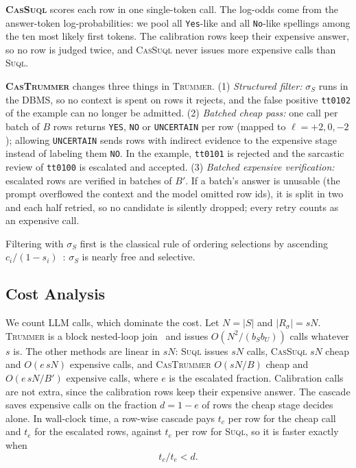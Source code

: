\documentclass[sigconf]{acmart}
\begin{document}
\textbf{\textsc{CasSuql}} scores each row in one single-token call. The log-odds come from the answer-token log-probabilities: we pool all \texttt{Yes}-like and all \texttt{No}-like spellings among the ten most likely first tokens. The calibration rows keep their expensive answer, so no row is judged twice, and \textsc{CasSuql} never issues more expensive calls than \textsc{Suql}.

\textbf{\textsc{CasTrummer}} changes three things in \textsc{Trummer}. (1) \emph{Structured filter:} $\sigma_S$ runs in the DBMS, so no context is spent on rows it rejects, and the false positive \texttt{tt0102} of the example can no longer be admitted. (2) \emph{Batched cheap pass:} one call per batch of $B$ rows returns \texttt{YES}, \texttt{NO} or \texttt{UNCERTAIN} per row (mapped to $\ell=+2,0,-2$); allowing \texttt{UNCERTAIN} sends rows with indirect evidence to the expensive stage instead of labeling them \texttt{NO}. In the example, \texttt{tt0101} is rejected and the sarcastic review of \texttt{tt0100} is escalated and accepted. (3) \emph{Batched expensive verification:} escalated rows are verified in batches of $B'$. If a batch's answer is unusable (the prompt overflowed the context and the model omitted row ids), it is split in two and each half retried, so no candidate is silently dropped; every retry counts as an expensive call.

Filtering with $\sigma_S$ first is the classical rule of ordering selections by ascending $c_i/(1-s_i)$~\cite{hellerstein1993predicate,urban2024eleet}: $\sigma_S$ is nearly free and selective.

\subsection{Cost Analysis}
\label{sec:cost}
We count LLM calls, which dominate the cost. Let $N=|S|$ and $|R_\sigma|=sN$. \textsc{Trummer} is a block nested-loop join~\cite{garcia2008database,ramakrishnan2003database} and issues $O(N^2/(b_Sb_U))$ calls whatever $s$ is. The other methods are linear in $sN$: \textsc{Suql} issues $sN$ calls, \textsc{CasSuql} $sN$ cheap and $O(e\,sN)$ expensive calls, and \textsc{CasTrummer} $O(sN/B)$ cheap and $O(e\,sN/B')$ expensive calls, where $e$ is the escalated fraction. Calibration calls are not extra, since the calibration rows keep their expensive answer. The cascade saves expensive calls on the fraction $d=1-e$ of rows the cheap stage decides alone. In wall-clock time, a row-wise cascade pays $t_c$ per row for the cheap call and $t_e$ for the escalated rows, against $t_e$ per row for \textsc{Suql}, so it is faster exactly when
\[ t_c / t_e < d. \]
\end{document}
